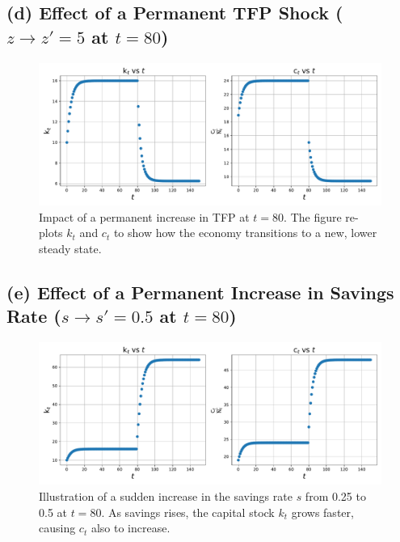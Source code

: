 \documentclass[12pt]{article}
\begin{document}
    \subsection*{(d) Effect of a Permanent TFP Shock ($z \to z'=5$ at $t=80$)}
    \begin{figure}[H]
        \centering
        \includegraphics[width= 1\textwidth]{2(d).pdf}
        \caption{Impact of a permanent increase in TFP at $t=80$. 
        The figure re-plots $k_t$ and $c_t$ to show how the economy transitions to a new, 
        lower steady state.}
        \label{fig:2(d)}
    \end{figure}
    
    \subsection*{(e) Effect of a Permanent Increase in Savings Rate ($s \to s'=0.5$ at $t=80$)}
    \begin{figure}[H]
        \centering
        \includegraphics[width= 1\textwidth]{2(e).pdf}
        \caption{Illustration of a sudden increase in the savings rate $s$ from 0.25 to 0.5 at $t=80$.
        As savings rises, the capital stock $k_t$ grows faster, causing $c_t$ also to increase.
}
        \label{fig:2(e)}
    \end{figure}

\end{document}
